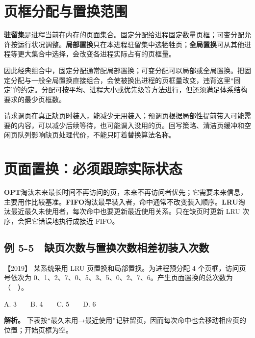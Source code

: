 \section{页框分配与置换范围}\label{os-5-8}

\textbf{驻留集}是进程当前在内存的页面集合。固定分配给进程固定数量页框；可变分配允许按运行状况调整。\textbf{局部置换}只在本进程驻留集中选牺牲页；\textbf{全局置换}可从其他进程等更大集合中选择，会改变各进程实际占有的页框量。

因此经典组合中，固定分配通常配局部置换；可变分配可以局部或全局置换。把固定分配与一般全局置换直接组合，会使被换出进程的页框量改变，违背这里``固定''的约定。分配可按平均、进程大小或优先级等方法进行，但还须满足体系结构要求的最少页框数。

请求调页在真正缺页时装入，能减少无用装入；预调页根据局部性提前带入可能需要的内容，可以减少后续等待，也可能调入没用的页。回写策略、清洁页缓冲和空闲页队列影响缺页处理代价，不能只盯着替换算法名称。

\section{页面置换：必须跟踪实际状态}\label{os-5-9}

\textbf{OPT}淘汰未来最长时间不再访问的页，未来不再访问者优先；它需要未来信息，主要用作比较基准。\textbf{FIFO}淘汰最早装入者，命中通常不改变装入顺序。\textbf{LRU}淘汰最近最久未使用者，每次命中也要更新最近使用关系。只在缺页时更新 LRU 次序，会把它错误地执行成接近 FIFO。

\subsection{例 5-5　缺页次数与置换次数相差初装入次数}\label{os-ex5-5}

\noindent{}【2019】 某系统采用 LRU 页置换和局部置换。为进程预分配 4 个页框，访问页号依次为 0、1、2、7、0、5、3、5、0、2、7、6。产生页面置换的总次数为（　）。

A. 3　　B. 4　　C. 5　　D. 6


\textbf{解析。} 下表按``最久未用→最近使用''记驻留页，因而每次命中也会移动相应页的位置；开始页框为空。

